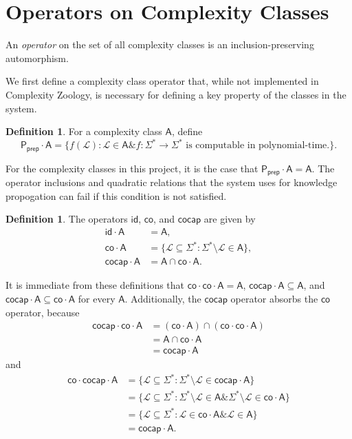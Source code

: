 \documentclass[12pt]{article}
\theoremstyle{definition}
\newtheorem{definition}[theorem]{Definition}
\theoremstyle{remark}
\newcommand{\ra}{\rightarrow}
\newcommand{\cL}{\mathcal{L}}
\newcommand{\A}{\mathsf{A}}
\newcommand{\co}{\mathsf{co}}
\newcommand{\cocap}{\mathsf{cocap}}
\newcommand{\msf}[1]{\mathsf{#1}}
\newcommand{\id}{\msf{id}}
\newcommand{\AND}{\mathbin{\&}}
\begin{document}
\section{Operators on Complexity Classes}

An \textit{operator} on the set of all complexity classes is an
inclusion-preserving automorphism.

We first define a complexity class operator that, while not implemented in
Complexity Zoology, is necessary for defining a key property of the classes in
the system.
\begin{definition}
For a complexity class $\A$, define
\[
\msf{P_{prep}}\cdot\A=\{f(\cL):\cL\in\A\AND f:\Sigma^*\ra\Sigma^*\text{ is
computable in polynomial-time.}\}.
\]
\end{definition}
For the complexity classes in this project, it is the case that
$\msf{P_{prep}}\cdot\A=\A$. The operator inclusions and quadratic relations
that the system uses for knowledge propogation can fail if this condition is not
satisfied.

\begin{definition}
The operators $\id$, $\co$, and $\cocap$ are given by
\begin{align*}
\id\cdot\A&=\A, \\
\co\cdot\A&=\{\cL\subseteq\Sigma^*:\Sigma^*\setminus\cL\in\A\}, \\
\cocap\cdot\A&=\A\cap\co\cdot\A.
\end{align*}
\end{definition}

It is immediate from these definitions that $\co\cdot\co\cdot\A=\A$,
$\cocap\cdot\A\subseteq\A$, and $\cocap\cdot\A\subseteq\co\cdot\A$ for every
$\A$. Additionally, the $\cocap$ operator absorbs the $\co$ operator, because
\begin{align*}
\cocap\cdot\co\cdot\A&=(\co\cdot\A)\cap(\co\cdot\co\cdot\A) \\
&=\A\cap\co\cdot\A \\
&=\cocap\cdot\A
\end{align*}
and
\begin{align*}
\co\cdot\cocap\cdot\A&=\{\cL\subseteq\Sigma^*:\Sigma^*\setminus\cL\in\cocap\cdot
\A\} \\
&=\{\cL\subseteq\Sigma^*:\Sigma^*\setminus\cL\in\A
\AND\Sigma^*\setminus\cL\in\co\cdot\A\} \\
&=\{\cL\subseteq\Sigma^*:\cL\in\co\cdot\A\AND\cL\in\A\} \\
&=\cocap\cdot\A.
\end{align*}
\end{document}
